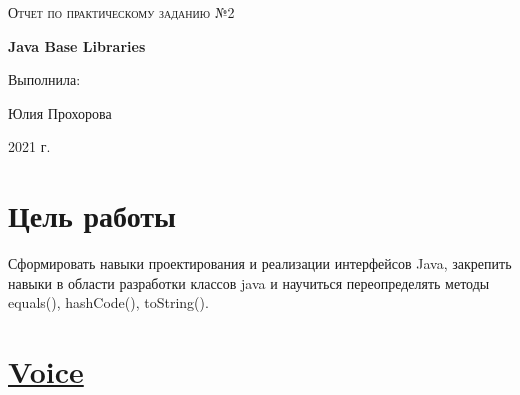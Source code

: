 \documentclass[a4paper]{article}
\begin{document}
\begin{titlepage}
	\centering
    
	\vspace{10cm}
	{\scshape\LARGE  Отчет по практическому заданию №2 \par}
	\vspace{1cm}
	{\huge\bfseries  Java Base Libraries\par}
	\vspace{1cm}
	\vfill
\begin{flushright}
	{\large Выполнила:}\par
	\vspace{0.3cm}
    {\LARGE Юлия Прохорова}
\end{flushright}
	
	\vfill

	2021 г.
\end{titlepage}

\newpage

\pagestyle{fancy} 
\fancyhead[C]{}
\fancyfoot{}
\fancyfoot[C]{ \noindent\rule{\textwidth}{0.4pt} \thepage }

\tableofcontents

\newpage

\newcommand{\RNumb}[1]{\uppercase\expandafter{\romannumeral #1\relax}}

\section{Цель работы}
Сформировать навыки проектирования и реализации интерфейсов Java, закрепить навыки в области разработки классов java и научиться переопределять методы equals(), hashCode(), toString().

\section{\href{https://github.com/julproh/5_sem/tree/main/NetCracker/Java_Basics_and_OOP/practise_tasks/second_task/voice}{Voice}}
\end{document}
